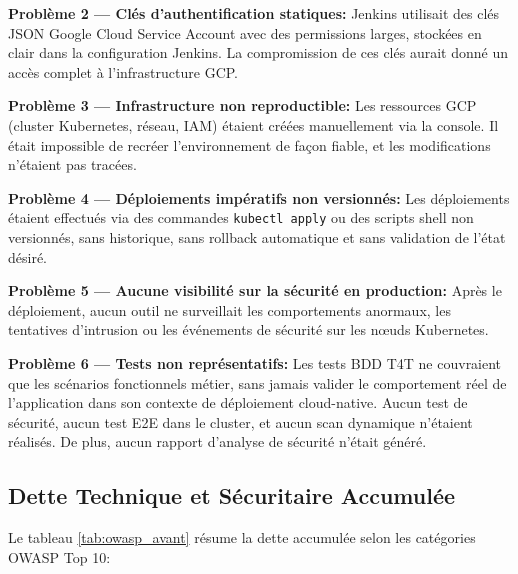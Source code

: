 \textbf{Problème 2 --- Clés d'authentification statiques:}
Jenkins utilisait des clés JSON Google Cloud Service Account avec des permissions larges, stockées
en clair dans la configuration Jenkins. La compromission de ces clés aurait donné un accès complet
à l'infrastructure GCP.

\textbf{Problème 3 --- Infrastructure non reproductible:}
Les ressources GCP (cluster Kubernetes, réseau, IAM) étaient créées manuellement via la console.
Il était impossible de recréer l'environnement de façon fiable, et les modifications n'étaient
pas tracées.

\textbf{Problème 4 --- Déploiements impératifs non versionnés:}
Les déploiements étaient effectués via des commandes \texttt{kubectl apply} ou des scripts shell
non versionnés, sans historique, sans rollback automatique et sans validation de l'état désiré.

\textbf{Problème 5 --- Aucune visibilité sur la sécurité en production:}
Après le déploiement, aucun outil ne surveillait les comportements anormaux, les tentatives
d'intrusion ou les événements de sécurité sur les nœuds Kubernetes.

\textbf{Problème 6 --- Tests non représentatifs:}
Les tests BDD T4T ne couvraient que les scénarios fonctionnels métier, sans jamais valider
le comportement réel de l'application dans son contexte de déploiement cloud-native.
Aucun test de sécurité, aucun test E2E dans le cluster, et aucun scan dynamique n'étaient
réalisés. De plus, aucun rapport d'analyse de sécurité n'était généré.

\subsection{Dette Technique et Sécuritaire Accumulée}

 Le tableau \ref{tab:owasp_avant} résume la dette accumulée selon les catégories OWASP Top 10:

